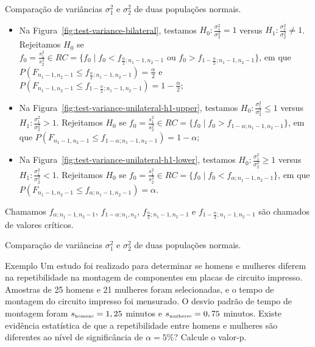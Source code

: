 \documentclass[9pt]{beamer}
\begin{document}
\begin{frame}{Comparação de variâncias $\sigma_1^2$ e $\sigma_2^2$ de duas populações normais.}

\begin{itemize}
	\item Na Figura~\ref{fig:test-variance-bilateral}, testamos $H_0: \frac{\sigma_1^2}{\sigma_2^2} = 1$ versus $H_1: \frac{\sigma_1^2}{\sigma_2^2} \neq 1$. Rejeitamos $H_0$ se $f_0 = \frac{s_1^2}{s_2^2} \in \allowbreak RC=\{f_0 \mid f_0 < f_{\frac{\alpha}{2};n_1-1, n_2-1} \mbox{ ou } f_0 > f_{1-\frac{\alpha}{2}; n_1-1, n_2-1} \}$, em que $P\left( F_{n_1-1, n_2-1} \leq f_{\frac{\alpha}{2};n_1-1, n_2-1} \right) = \frac{\alpha}{2}$ e $P\left(F_{n_1-1, n_2-1} \leq  f_{1-\frac{\alpha}{2};n_1-1, n_2-1} \right) = 1- \frac{\alpha}{2}$;
	\vfill
	
	\item Na Figura~\ref{fig:test-variance-unilateral-h1-upper}, testamos $H_0: \frac{\sigma_1^2}{\sigma_2^2} \leq 1$ versus $H_1: \frac{\sigma_1^2}{\sigma_2^2} > 1$. Rejeitamos $H_0$ se $f_0 = \frac{s_1^2}{s_2^2}  \in \allowbreak RC=\{f_0 \mid f_0 > f_{1-\alpha; n_1-1, n_2-1}  \}$, em que $P\left(F_{n_1-1, n_2-1} \leq  f_{1-\alpha;n_1-1, n_2-1} \right) =1- \alpha$;
	\vfill
	
	\item Na Figura~\ref{fig:test-variance-unilateral-h1-lower}, testamos $H_0: \frac{\sigma_1^2}{\sigma_2^2} \geq 1$ versus $H_1: \frac{\sigma_1^2}{\sigma_2^2} < 1$. Rejeitamos $H_0$ se $f_0 = \frac{s_1^2}{s_2^2} \in \allowbreak RC=\{f_0 \mid f_0 < f_{\alpha;n_1-1, n_2-1}  \}$, em que $P\left(F_{n_1-1, n_2-1} \leq f_{\alpha;n_1-1, n_2-1} \right) = \alpha$.
\end{itemize}
Chamamos $f_{\alpha; n_1-1, n_2-1}$, $f_{1-\alpha;n_1, n_2}$, $f_{\frac{\alpha}{2}; n_1-1, n_2-1}$ e $f_{1-\frac{\alpha}{2}; n_1-1, n_2-1}$ são chamados de valores críticos.

\end{frame}

\begin{frame}{Comparação de variâncias $\sigma_1^2$ e $\sigma_2^2$ de duas populações normais.}

\large
\begin{block}{Exemplo}
	Um estudo foi realizado para determinar se homens e mulheres diferem na repetibilidade na montagem de componentes em placas de circuito impresso. Amostras de 25 homens e 21 mulheres foram selecionadas, e o tempo de montagem do circuito impresso foi mensurado. 
	O desvio padrão de tempo de montagem foram $s_{\tiny \mbox{homens}} = 1,25$ minutos e $s_{\tiny \mbox{mulheres}} = 0,75$ minutos. Existe evidência estatística de que a repetibilidade entre homens e mulheres são diferentes ao nível de significância de $\alpha=5\%$? Calcule o valor-p.
\end{block}
 
\normalsize
 \end{frame}
\end{document}
